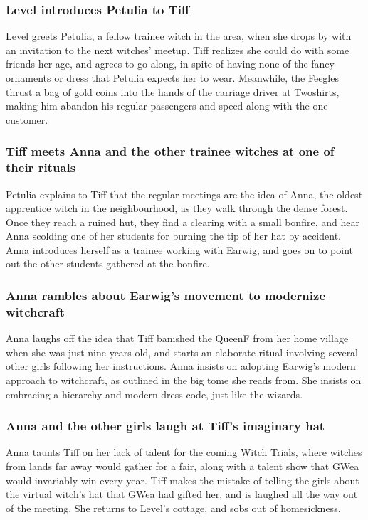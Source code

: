 \subsubsection{\Gls{Level} introduces \Gls{Petulia} to \Gls{Tiff}}
\Gls{Level} greets \Gls{Petulia}, a fellow trainee witch in the area, when she drops by with an
invitation to the next witches' meetup. \Gls{Tiff} realizes she could do with some friends her age,
and agrees to go along, in spite of having none of the fancy ornaments or dress that \Gls{Petulia}
expects her to wear. Meanwhile, the Feegles thrust a bag of gold coins into the hands of the
carriage driver at Twoshirts, making him abandon his regular passengers and speed along with the
one customer.

\subsubsection{\Gls{Tiff} meets \Gls{Anna} and the other trainee witches at one of their rituals}
\Gls{Petulia} explains to \Gls{Tiff} that the regular meetings are the idea of \Gls{Anna}, the
oldest apprentice witch in the neighbourhood, as they walk through the dense forest. Once they reach
a ruined hut, they find a clearing with a small bonfire, and hear \Gls{Anna} scolding one of her
students for burning the tip of her hat by accident. \Gls{Anna} introduces herself as a trainee
working with \Gls{Earwig}, and goes on to point out the other students gathered at the bonfire.

\subsubsection{\Gls{Anna} rambles about \Gls{Earwig}'s movement to modernize witchcraft}
\Gls{Anna} laughs off the idea that \Gls{Tiff} banished the \Gls{QueenF} from her home village when
she was just nine years old, and starts an elaborate ritual involving several other girls following
her instructions. \Gls{Anna} insists on adopting \Gls{Earwig}'s modern approach to witchcraft, as
outlined in the big tome she reads from. She insists on embracing a hierarchy and modern dress code,
just like the wizards.

\subsubsection{\Gls{Anna} and the other girls laugh at \Gls{Tiff}'s imaginary hat}
\Gls{Anna} taunts \Gls{Tiff} on her lack of talent for the coming Witch Trials, where witches from
lands far away would gather for a fair, along with a talent show that \Gls{GWea} would invariably
win every year. \Gls{Tiff} makes the mistake of telling the girls about the virtual witch's hat that
\Gls{GWea} had gifted her, and is laughed all the way out of the meeting. She returns to
\Gls{Level}'s cottage, and sobs out of homesickness.

